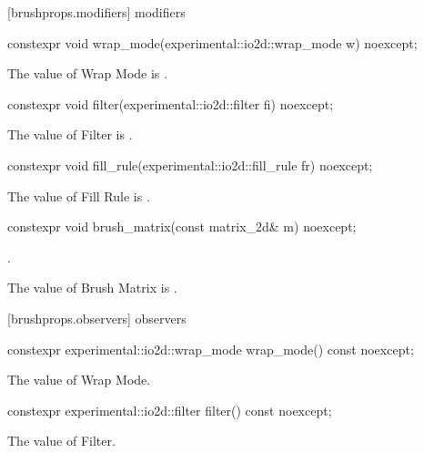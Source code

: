  [brushprops.modifiers] { modifiers}

\begin{itemdecl}
constexpr void wrap_mode(experimental::io2d::wrap_mode w) noexcept;
\end{itemdecl}
\begin{itemdescr}
\pnum
\effects
The value of Wrap Mode is .
\end{itemdescr}

\begin{itemdecl}
constexpr void filter(experimental::io2d::filter fi) noexcept;
\end{itemdecl}
\begin{itemdescr}
\pnum
\effects
The value of Filter is .
\end{itemdescr}

\begin{itemdecl}
constexpr void fill_rule(experimental::io2d::fill_rule fr) noexcept;
\end{itemdecl}
\begin{itemdescr}
\pnum
\effects
The value of Fill Rule is .
\end{itemdescr}

\begin{itemdecl}
constexpr void brush_matrix(const matrix_2d& m) noexcept;
\end{itemdecl}
\begin{itemdescr}
\pnum
\preconditions
{}.

\pnum
\effects
The value of Brush Matrix is .
\end{itemdescr}

 [brushprops.observers] { observers}

\begin{itemdecl}
constexpr experimental::io2d::wrap_mode wrap_mode() const noexcept;
\end{itemdecl}
\begin{itemdescr}
\pnum
\returns
The value of Wrap Mode.
\end{itemdescr}

\begin{itemdecl}
constexpr experimental::io2d::filter filter() const noexcept;
\end{itemdecl}
\begin{itemdescr}
\pnum
\returns
The value of Filter.
\end{itemdescr}


